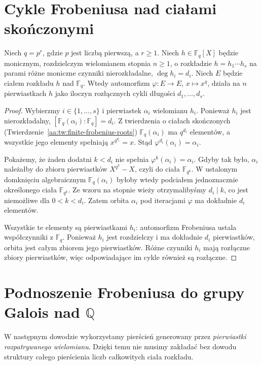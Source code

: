 \section{Cykle Frobeniusa nad ciałami skończonymi}
\begin{twierdzenie}\label{aa:tw:frob-cycles}
Niech $q=p^r$, gdzie $p$ jest liczbą pierwszą, a $r\ge1$.
Niech $h\in\mathbb F_q[X]$ będzie monicznym, rozdzielczym
wielomianem stopnia $n\ge1$, o rozkładzie
$h=h_1\cdots h_s$ na parami różne moniczne czynniki
nierozkładalne, $\deg h_i=d_i$.
Niech $E$ będzie ciałem rozkładu $h$ nad $\mathbb F_q$.
Wtedy automorfizm $\varphi:E\to E$, $x\mapsto x^q$,
działa na $n$ pierwiastkach $h$ jako iloczyn rozłącznych
cykli długości $d_1,\ldots,d_s$.
\end{twierdzenie}
\begin{proof}
Wybierzmy $i\in\{1,\ldots,s\}$ i pierwiastek $\alpha_i$
wielomianu $h_i$. Ponieważ $h_i$ jest nierozkładalny,
$[\mathbb F_q(\alpha_i):\mathbb F_q]=d_i$.
Z twierdzenia o ciałach skończonych
(Twierdzenie~\ref{aa:tw:finite-frobenius-roots})
$\mathbb F_q(\alpha_i)$ ma $q^{d_i}$ elementów,
a wszystkie jego elementy spełniają $x^{q^{d_i}}=x$.
Stąd $\varphi^{d_i}(\alpha_i)=\alpha_i$.

Pokażemy, że żaden dodatni $k<d_i$ nie spełnia
$\varphi^k(\alpha_i)=\alpha_i$. Gdyby tak było,
$\alpha_i$ należałby do zbioru pierwiastków
$X^{q^k}-X$, czyli do ciała $\mathbb F_{q^k}$.
W ustalonym domknięciu algebraicznym
$\mathbb F_q(\alpha_i)$ byłoby wtedy podciałem
jednoznacznie określonego ciała $\mathbb F_{q^k}$.
Ze wzoru na stopnie wieży otrzymalibyśmy
$d_i\mid k$, co jest niemożliwe dla $0<k<d_i$.
Zatem orbita $\alpha_i$ pod iteracjami $\varphi$
ma dokładnie $d_i$ elementów.

Wszystkie te elementy są pierwiastkami $h_i$:
automorfizm Frobeniusa ustala współczynniki z $\mathbb F_q$.
Ponieważ $h_i$ jest rozdzielczy i ma dokładnie $d_i$
pierwiastków, orbita jest całym zbiorem jego pierwiastków.
Różne czynniki $h_i$ mają rozłączne zbiory pierwiastków,
więc odpowiadające im cykle również są rozłączne.
\end{proof}

\section{Podnoszenie Frobeniusa do grupy Galois nad \texorpdfstring{$\mathbb Q$}{Q}}
W następnym dowodzie wykorzystamy pierścień generowany
przez \emph{pierwiastki rozpatrywanego wielomianu}.
Dzięki temu nie musimy zakładać bez dowodu struktury całego
pierścienia liczb całkowitych ciała rozkładu.

